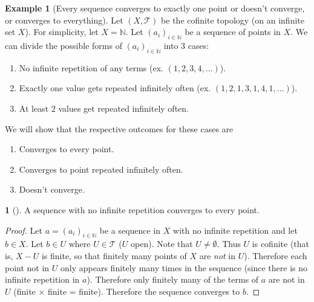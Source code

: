 \documentclass[11pt]{article}
\numberwithin{equation}{section}
\newcounter{theo}[section]\setcounter{theo}{0}
\theoremstyle{definition}
\newtheorem{claim}{\color{ForestGreen}{\textbf{Claim}}}[section]
\theoremstyle{definition}
\newtheorem{example}{\color{WildStrawberry}Example}[section]
\newcommand{\1}{\mathbbm 1}
\newcommand{\NN}{\mathbb N}
\newcommand{\tT}{\mathcal T}
\begin{document}
\begin{example}[Every sequence converges to exactly one point or doesn't converge, or converges to everything]
	Let $(X,\tT)$ be the cofinite topology (on an infinite set $X$). For simplicity, let $X = \NN$. Let $(a_i)_{i \in \NN}$ be a sequence of points in $X$. We can divide the possible forms of $(a_i)_{i \in \NN}$ into 3 cases:
	\begin{enumerate}
		\item No infinite repetition of any terms (ex. $(1,2,3,4,\ldots)$).
		\item Exactly one value gets repeated infinitely often (ex. $(1,2,1,3,1,4,1,\ldots)$).
		\item At least $2$ values get repeated infinitely often.
	\end{enumerate}
	We will show that the respective outcomes for these cases are
	\begin{enumerate}
		\item Converges to every point.
		\item Converges to point repeated infinitely often.
		\item Doesn't converge.
	\end{enumerate}

	\begin{claim}[]
		A sequence with no infinite repetition converges to every point.
	\end{claim}
	\begin{proof}
		 Let $a=(a_i)_{i \in \NN}$ be a sequence in $X$ with no infinite repetition and let $b \in X$. Let $b \in U$ where $U \in \tT$ ($U$ open). Note that $U \neq \emptyset$. Thus $U$ is cofinite (that is, $X-U$ is finite, so that finitely many points of $X$ are \emph{not} in $U$). Therefore each point not in $U$ only appears finitely many times in the sequence (since there is no infinite repetition in $a$). Therefore only finitely many of the terms of $a$ are not in $U$ (finite $\times$ finite = finite). Therefore the sequence converges to $b$. 
	\end{proof}
	
	
\end{example}
\end{document}
